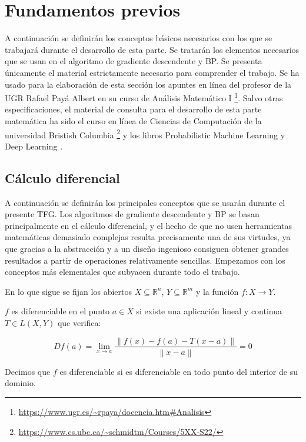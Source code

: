 

\section{Fundamentos previos}
A continuación se definirán los conceptos básicos necesarios con los que se trabajará durante el desarrollo de esta parte. Se tratarán los elementos necesarios que se usan en el algoritmo de gradiente descendente y BP. Se presenta únicamente el material estrictamente necesario para comprender el trabajo. Se ha usado para la elaboración de esta sección los apuntes en línea del profesor de la UGR Rafael Payá Albert en su curso de Análisis Matemático I \footnote{\url{https://www.ugr.es/~rpaya/docencia.htm\#Analisis}}.  Salvo otras especificaciones, el material de consulta para el desarrollo de esta parte matemática ha sido el curso en línea de Ciencias de Computación de la universidad Bristish Columbia \footnote{\url{https://www.cs.ubc.ca/~schmidtm/Courses/5XX-S22/}} y los libros Probabilistic Machine Learning \cite{murphy2022probabilistic} y Deep Learning \cite{GoodFellowBook}.


\subsection{Cálculo diferencial}

A continuación se definirán los principales conceptos que se usarán durante el presente TFG. Los algoritmos de gradiente descendente y BP se basan principalmente en el cálculo diferencial, y el hecho de que no usen herramientas matemáticas demasiado complejas resulta precisamente una de sus virtudes, ya que gracias a la abstracción y a un diseño ingenioso consiguen obtener grandes resultados a partir de operaciones relativamente sencillas. Empezamos con los conceptos más elementales que subyacen durante todo el trabajo.

En lo que sigue se fijan los abiertos $X \subseteq \mathbb{R}^n$, $Y \subseteq \mathbb{R}^m$ y la función $f: X \rightarrow Y$.


\begin{definicion}
    $f$ es diferenciable en el punto $a \in X$ si existe una aplicación lineal y continua $T \in L(X,Y)$ que verifica:

    $$Df(a) = \displaystyle \lim_{x \to a} \frac{\left\| f(x)-f(a)-T(x-a)\right\|}{\left\| x-a\right\|}=0$$
    
    Decimos que $f$ es diferenciable si es diferenciable en todo punto del interior de su dominio.
\end{definicion}





